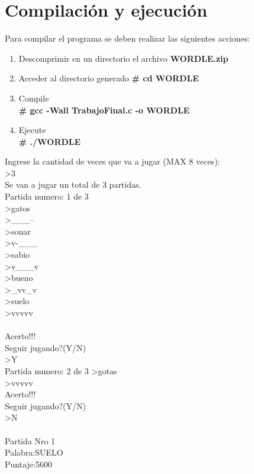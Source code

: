\documentclass[oneside]{article}
\begin{document}
	\newpage
	\thispagestyle{fancy}
	
	\section*{Compilación y ejecución}
	Para compilar el programa se deben realizar las siguientes acciones:
		\begin{enumerate}
		\item Descomprimir en un directorio el archivo \textbf{WORDLE.zip}
		\item Acceder al directorio generado \textbf{\# cd WORDLE}
		\item Compile\\ \textbf{\# gcc -Wall TrabajoFinal.c -o WORDLE}
		\item Ejecute\\ \textbf{\# ./WORDLE}		
		\end{enumerate}
	Ingrese la cantidad de veces que va a jugar (MAX 8 veces):\\
	\textgreater3 \\
	Se van a jugar un total de 3 partidas.\\
	Partida numero: 1 de 3 \\
	\textgreater gatos\\
	\textgreater \_\_\_--\\
	\textgreater sonar\\
	\textgreater v-\_\_\_\\
	\textgreater sabio\\
	\textgreater v\_\_\_v\\
	\textgreater bueno\\
	\textgreater \_vv\_v\\
	\textgreater suelo\\
	\textgreater vvvvv\\	
	\\Acerto!!!\\
	Seguir jugando?(Y/N)\\ 
	\textgreater Y\\
	Partida numero: 2 de 3 
	\textgreater gotas\\
	\textgreater vvvvv\\	
	Acerto!!!\\
	Seguir jugando?(Y/N)\\
	\textgreater N\\ \\
	Partida Nro 1\\
	Palabra:SUELO\\
	Puntaje:5600\\
\end{document}

